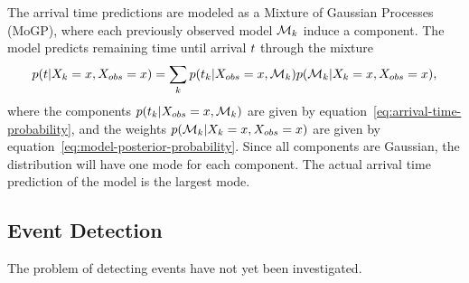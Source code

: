 The arrival time predictions are modeled as a Mixture of Gaussian
Processes (MoGP), where each previously observed model $\mathcal{M}_{k}$ induce a component. The
model predicts remaining time until arrival $t$ through the mixture
\begin{equation}
  \label{eq:arrival-time-mixture}
  p(t \vert X_{k} = x, X_{obs} = x) = 
  \sum_{k}p(t_{k} \vert X_{obs} = x, \mathcal{M}_{k})
  p(\mathcal{M}_{k} \vert X_{k} = x, X_{obs} = x),
\end{equation}
where the components $p(t_{k} \vert X_{obs} = x,
\mathcal{M}_{k})$ are given by equation~\ref{eq:arrival-time-probability},
and the weights $p(\mathcal{M}_{k} \vert X_{k} = x, X_{obs} = x)$
are given by equation~\ref{eq:model-posterior-probability}. Since all
components are Gaussian, the distribution will have one mode for each component. The
actual arrival time prediction of the model is the largest mode.



\subsection{Event Detection}
The problem of detecting events have not yet been investigated.

